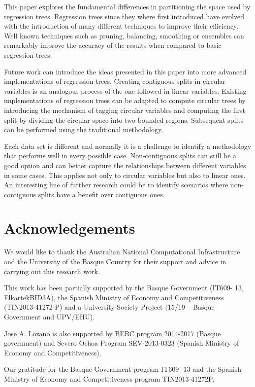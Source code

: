 \documentclass[times,twocolumn,final,authoryear]{elsarticle}
\begin{document}
This paper explores the fundamental differences in partitioning the space used by regression trees. Regression trees since they where first introduced have evolved with the introduction of many different techniques to improve their efficiency. Well known techniques such as pruning, balancing, smoothing \citep{Breimanetal1984, Quinlan1993} or ensembles \citep{Buhlmann2012} can remarkably improve the accuracy of the results when compared to basic regression trees.

Future work can introduce the ideas presented in this paper into more advanced implementations of regression trees. Creating contiguous splits in circular variables is an analogous process of the one followed in linear variables. Existing implementations of regression trees can be adapted to compute circular trees by introducing the mechanism of tagging circular variables and computing the first split by dividing the circular space into two bounded regions. Subsequent splits can be performed using the traditional methodology.

Each data set is different and normally it is a challenge to identify a methodology that performs well in every possible case. Non-contiguous splits can still be a good option and can better capture the relationships between different variables in some cases. This applies not only to circular variables but also to linear ones. An interesting line of further research could be to identify scenarios where non-contiguous splits have a benefit over contiguous ones.


\section*{Acknowledgements}

We would like to thank the Australian National Computational Infrastructure and the University of the Basque Country for their support and advice in carrying out this research work.

This work has been partially supported by the Basque Government (IT609-
13, ElkartekBID3A), the Spanish Ministry of Economy and Competitiveness (TIN2013-41272-P) and a University-Society Project (15/19 – Basque Government and UPV/EHU). 

Jose A. Lozano is also supported by BERC program 2014-2017 (Basque government) and Severo Ochoa Program SEV-2013-0323 (Spanish Ministry of Economy and Competitiveness).

Our gratitude for the Basque Government program IT609- 13 and the Spanish Ministry of Economy and Competitiveness program TIN2013-41272P.
\end{document}
